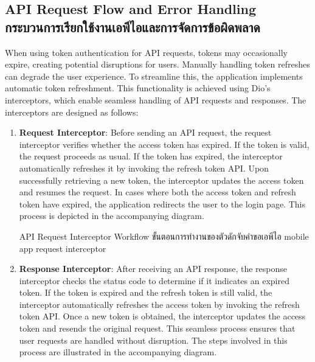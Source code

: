 \subsection{\ifenglish API Request Flow and Error Handling \else กระบวนการเรียกใช้งานเอพีไอและการจัดการข้อผิดพลาด \fi}
When using token authentication for API requests, tokens may occasionally expire, creating potential disruptions for users. Manually handling token refreshes can degrade the user experience. To streamline this, the application implements automatic token refreshment. This functionality is achieved using Dio’s interceptors, which enable seamless handling of API requests and responses. The interceptors are designed as follows:
\begin{enumerate}
    \item \textbf{Request Interceptor}: Before sending an API request, the request interceptor verifies whether the access token has expired. If the token is valid, the request proceeds as usual. If the token has expired, the interceptor automatically refreshes it by invoking the refresh token API. Upon successfully retrieving a new token, the interceptor updates the access token and resumes the request. In cases where both the access token and refresh token have expired, the application redirects the user to the login page. This process is depicted in the accompanying diagram.  
    
    {\ifenglish API Request Interceptor Workflow \else ขั้นตอนการทำงานของตัวดักจับคำขอเอพีไอ\fi}
    {mobile app request interceptor}
    \item \textbf{Response Interceptor}: After receiving an API response, the response interceptor checks the status code to determine if it indicates an expired token. If the token is expired and the refresh token is still valid, the interceptor automatically refreshes the access token by invoking the refresh token API. Once a new token is obtained, the interceptor updates the access token and resends the original request. This seamless process ensures that user requests are handled without disruption. The steps involved in this process are illustrated in the accompanying diagram.      
\end{enumerate}
